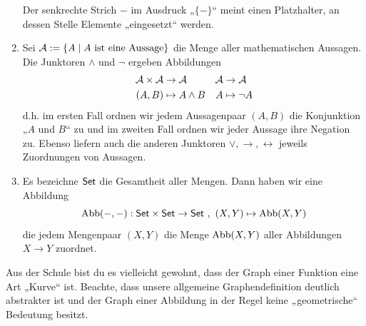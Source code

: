 \begin{bsp}
\begin{enumerate}
        Der senkrechte Strich $-$ im Ausdruck „$\{-\}$“ meint einen Platzhalter, an dessen Stelle Elemente „eingesetzt“ werden.
        \item Sei $\mathcal A:=\{A\mid A\ \text{ist eine Aussage}\}$ die Menge aller mathematischen Aussagen. Die Junktoren $\land$ und $\neg$ ergeben Abbildungen
        \begin{align*}
            \mathcal A\times \mathcal A & \to \mathcal A & \mathcal A & \to \mathcal A \\
            (A,B) & \mapsto A\land B & A& \mapsto \neg A
        \end{align*}
        d.h. im ersten Fall ordnen wir jedem Aussagenpaar $(A,B)$ die Konjunktion „$A$ und $B$“ zu und im zweiten Fall ordnen wir jeder Aussage ihre Negation zu. Ebenso liefern auch die anderen Junktoren $\lor,\to,\leftrightarrow$ jeweils Zuordnungen von Aussagen.
        \item Es bezeichne $\mathsf{Set}$ die Gesamtheit aller Mengen. Dann haben wir eine Abbildung
            \[ \operatorname{Abb}(-,-) : \mathsf{Set} \times \mathsf{Set} \to \mathsf{Set} \ ,\ (X,Y) \mapsto \operatorname{Abb}(X,Y) \]
        die jedem Mengenpaar $(X,Y)$ die Menge $\operatorname{Abb}(X,Y)$ aller Abbildungen $X\to Y$ zuordnet.
    \end{enumerate}
    Aus der Schule bist du es vielleicht gewohnt, dass der Graph einer Funktion eine Art „Kurve“ ist. Beachte, dass unsere allgemeine Graphendefinition deutlich abstrakter ist und der Graph einer Abbildung in der Regel keine „geometrische“ Bedeutung besitzt.
\end{bsp}


